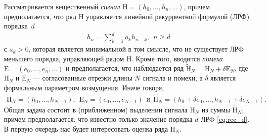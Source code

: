 \documentclass[specialist,
               substylefile = spbu_report.rtx,
               subf,href,colorlinks=true, 12pt]{disser}
\begin{document}
Рассматривается вещественный \emph{сигнал} $\mathrm{H}=(h_0,\ldots, h_n,\ldots)$, причем предполагается, что ряд $\mathrm{H}$ управляется линейной
рекуррентной формулой  (ЛРФ) порядка~$d$
\begin{gather}
	\label{eq:rec_d}
	h_n = \sum\limits_{k=1}^d a_kh_{n-k}, \ \ n \geqslant d
\end{gather}
с $a_d>0$, которая является минимальной в том смысле, что  не существует ЛРФ меньшего порядка, управляющей рядом $\mathrm{H}$.
Кроме того, вводится \emph{помеха} $\mathrm{E}=(e_0,\ldots, e_n,\ldots)$ и предполагается, что наблюдается ряд $\widetilde{\mathrm{H}}_N=\mathrm{H}_N+\delta
\mathrm{E}_N$, где  $\mathrm{H}_N$ и $\mathrm{E}_N$ --- согласованные отрезки длины $N$ сигнала и помехи, а
$\delta$ является формальным параметром возмущения. Иначе говоря,
\begin{gather*}
	\mathrm{H}_N=(h_0, \ldots, h_{N-1}), \ \ \mathrm{E}_N=(e_0, \ldots, e_{N-1}) \ \ \text{и}\ \
	\widetilde{\mathrm{H}}_N=(h_0+\delta e_0, \ldots, h_{N-1}+\delta e_{N-1}).
\end{gather*}
Общая задача состоит в (приближенном) выделении сигнала $\mathrm{H}_N$ из суммы $\widetilde{\mathrm{H}}_N$, причем предполагается, что известно только
значение порядка $d$ ЛРФ \eqref{eq:rec_d}.
В первую очередь нас будет интересовать оценка ряда $\mathrm{H}_N$.
\end{document}
